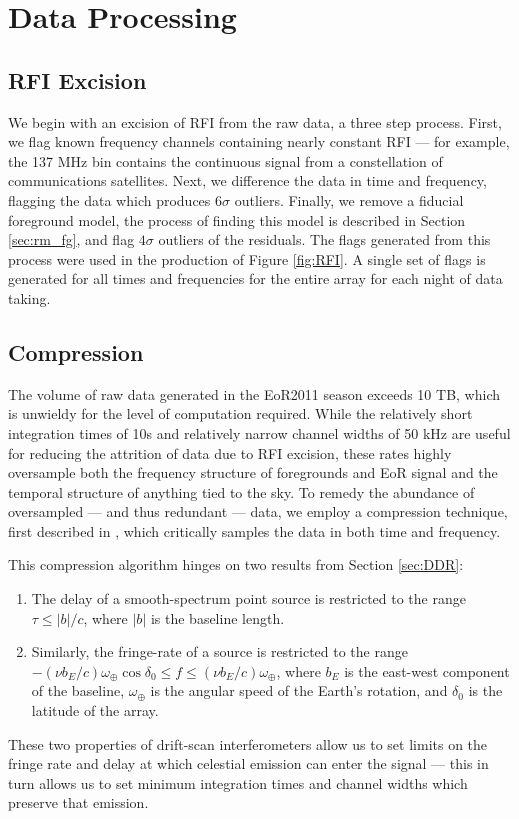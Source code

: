 \section{Data Processing}\label{sec:data}

\subsection{RFI Excision}
We begin with an excision of RFI from the raw data, a three step process. First, we flag known
frequency channels containing nearly constant RFI --- for example, the 137 MHz bin contains the
continuous signal from a constellation of communications satellites. Next, we difference the data in
time and frequency, flagging the data which produces $6\sigma$ outliers. Finally, we remove a
fiducial foreground model, the process of finding this model is described in Section
\ref{sec:rm_fg}, and flag $4\sigma$ outliers of the residuals. The flags generated from
this process were used in the production of Figure \ref{fig:RFI}. A single set of flags is generated
for all times and frequencies for the entire array for each night of data taking.

\subsection{Compression}\label{sec:compress}

The volume of raw data generated in the EoR2011 season exceeds 10 TB, which is unwieldy for 
the level of computation required. While the relatively short integration times of 10s and
relatively narrow channel widths of 50 kHz are useful for reducing the attrition of data due to RFI
excision, these rates highly oversample both the frequency structure of foregrounds and EoR signal
and the temporal structure of anything tied to the sky. To remedy the abundance of oversampled ---
and thus redundant --- data, we employ a compression technique, first described in
\citet{Parsons2014}, which critically samples the data in both time and frequency.

This compression algorithm hinges on two results from Section \ref{sec:DDR}:
\begin{enumerate}
  \item The delay of a smooth-spectrum point source is restricted to the range $\tau \le |b|/c$,
    where $|b|$ is the baseline length.
  \item Similarly, the fringe-rate of a source is restricted to the range $ -(\nu b_E/c) \omega_\oplus
    \cos\delta_0 \le f \le (\nu b_E/c) \omega_\oplus$, where $b_E$ is the east-west component of the
    baseline, $\omega_\oplus$ is the angular speed of the Earth's rotation, and $\delta_0$ is the
    latitude of the array.
\end{enumerate}
These two properties of drift-scan interferometers allow us to set limits on the fringe rate and
delay at which celestial emission can enter the signal --- this in turn allows us to set minimum
integration times and channel widths which preserve that emission. 


